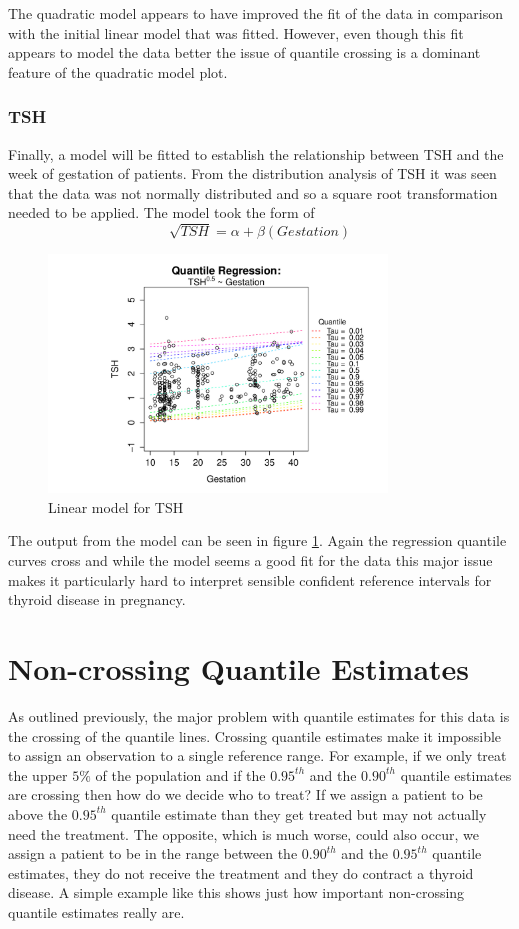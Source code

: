\documentclass[12pt,a4paper]{report}
\begin{document}
The quadratic model appears to have improved the fit of the data in comparison with the initial linear model that was fitted. However, even though this fit appears to model the data better the issue of quantile crossing is a dominant feature of the quadratic model plot.

\subsection{TSH}
Finally, a model will be fitted to establish the relationship between TSH and the week of gestation of patients. From the distribution analysis of TSH it was seen that the data was not normally distributed and so a square root transformation needed to be applied. The model took the form of
$$ \sqrt{TSH} = \alpha + \beta(Gestation) $$

\begin{figure}[ht]\centering
    \includegraphics[width=9cm]{QRTSHModel1.pdf}
   \caption{Linear model for TSH}
    \label{QR:TSHModel1}
\end{figure}
\vspace{2mm}

The output from the model can be seen in figure \ref{QR:TSHModel1}. Again the regression quantile curves cross and while the model seems a good fit for the data this major issue makes it particularly hard to interpret sensible confident reference intervals for thyroid disease in pregnancy.

\chapter{Non-crossing Quantile Estimates}
As outlined previously, the major problem with quantile estimates for this data is the crossing of the quantile lines. Crossing quantile estimates make it impossible to assign an observation to a single reference range. For example, if we only treat the upper $5\%$ of the population and if the $0.95^{th}$ and the $0.90^{th}$ quantile estimates are crossing then how do we decide who to treat? If we assign a patient to be above the $0.95^{th}$ quantile estimate than they get treated but may not actually need the treatment. The opposite, which is much worse, could also occur, we assign a patient to be in the range between the $0.90^{th}$ and the $0.95^{th}$ quantile estimates, they do not receive the treatment and they do contract a thyroid disease. A simple example like this shows just how important non-crossing quantile estimates really are.
\end{document}
